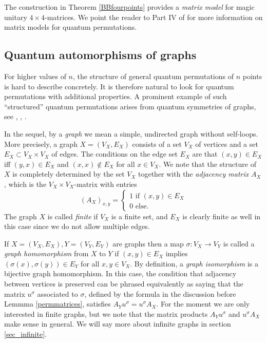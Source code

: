 \documentclass[a4paper]{amsart}
\numberwithin{equation}{section}
\theoremstyle{change}
\begin{document}
The construction in Theorem \ref{BBfourpoints} provides a \emph{matrix model} for magic unitary $ 4 \times 4 $-matrices. 
We point the reader to Part IV of \cite{BANICA_quantumpermutationgroups} for more information on matrix models for quantum permutations. 


\subsection{Quantum automorphisms of graphs} \label{sec_qutgraph}

For higher values of $ n $, the structure of general quantum permutations of $ n $ points is hard to describe concretely. It is therefore natural to look for quantum permutations with additional properties. A prominent example of such ``structured'' quantum permutations arises from quantum symmetries of graphs, see \cite{BANICA_quthomogeneousgraphs}, \cite{BANICA_BICHON_ordereleven}, \cite{SCHMIDT_distancetransitive}.

In the sequel, by a \emph{graph} we mean a simple, undirected graph without self-loops. 
More precisely, a graph $ X = (V_X, E_X) $ consists of a set $ V_X $ of vertices and a set $ E_X \subset V_X \times V_X $ of edges. The conditions on the edge set $ E_X $ are that $ (x,y) \in E_X $ iff $ (y,x) \in E_X $ and $ (x,x) \notin E_X $ for all $ x \in V_X $. 
We note that the structure of $ X $ is completely determined by the set $ V_X $ together with the \emph{adjacency matrix} $ A_X $, which is the $ V_X \times V_X $-matrix with entries 
$$
(A_X)_{x,y} = 
\begin{cases} 
1 \text{ if } (x,y) \in E_X \\
0 \text{ else.} 
\end{cases}
$$
The graph $ X $ is called \emph{finite} if $ V_X $ is a finite set, and $ E_X $ is clearly finite as well in this case since we do not allow multiple edges.

If $ X = (V_X, E_X), Y = (V_Y, E_Y)$ are graphs then a map $ \sigma: V_X \rightarrow V_Y $ is called a \emph{graph homomorphism} from $ X $ to $ Y $ if $ (x,y) \in E_X $ implies $ (\sigma(x), \sigma(y)) \in E_Y $ for all $ x,y \in V_X $. By definition, a \emph{graph isomorphism} is a bijective graph homomorphism. In this case, the condition that adjacency between vertices is preserved can be phrased equivalently as saying that the matrix $ u^\sigma $ associated to $ \sigma $, defined by the formula in the discussion before Lemmma \ref{permmatrices}, satisfies $ A_Y u^\sigma = u^\sigma A_X $. For the moment we are only interested in finite graphs, but we note that the matrix products $ A_Y u^\sigma $ and $ u^\sigma A_X $ make sense in general. We will say more about infinite graphs in section \ref{sec_infinite}. 
\end{document}
